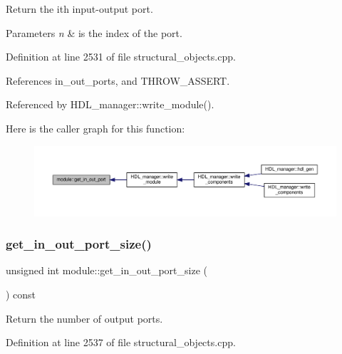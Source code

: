 Return the ith input-\/output port. 


\begin{DoxyParams}{Parameters}
{\em n} & is the index of the port. \\
\hline
\end{DoxyParams}


Definition at line 2531 of file structural\+\_\+objects.\+cpp.



References in\+\_\+out\+\_\+ports, and T\+H\+R\+O\+W\+\_\+\+A\+S\+S\+E\+RT.



Referenced by H\+D\+L\+\_\+manager\+::write\+\_\+module().

Here is the caller graph for this function\+:
\nopagebreak
\begin{figure}[H]
\begin{center}
\leavevmode
\includegraphics[width=350pt]{d0/dd3/classmodule_ac12c995f1c9cdcfde91134b4101a976c_icgraph}
\end{center}
\end{figure}
\mbox{\label{classmodule_ad33fb298d79ed9faf5531a41b5f8e647}} 
\subsubsection{\texorpdfstring{get\+\_\+in\+\_\+out\+\_\+port\+\_\+size()}{get\_in\_out\_port\_size()}}
{\footnotesize\ttfamily unsigned int module\+::get\+\_\+in\+\_\+out\+\_\+port\+\_\+size (\begin{DoxyParamCaption}{ }\end{DoxyParamCaption}) const}



Return the number of output ports. 



Definition at line 2537 of file structural\+\_\+objects.\+cpp.



